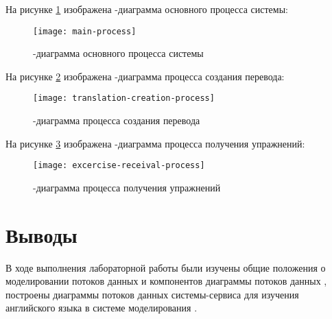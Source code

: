 \documentclass[a4paper,14pt]{extarticle}
\begin{document}
На рисунке \ref{fig:main-process} изображена -диаграмма основного
процесса системы:

\begin{figure}[H]
    \centering
    \texttt{[image: main-process]}
    \caption{-диаграмма основного процесса системы}
    \label{fig:main-process}
\end{figure}

На рисунке \ref{fig:translation-creation-process} изображена
-диаграмма процесса создания перевода:

\begin{figure}[H]
    \centering
    \texttt{[image: translation-creation-process]}
    \caption{-диаграмма процесса создания перевода}
    \label{fig:translation-creation-process}
\end{figure}

На рисунке \ref{fig:excercise-receival-process} изображена -диаграмма
процесса получения упражнений:

\begin{figure}[H]
    \centering
    \texttt{[image: excercise-receival-process]}
    \caption{-диаграмма процесса получения упражнений}
    \label{fig:excercise-receival-process}
\end{figure}

\section*{Выводы}
В ходе выполнения лабораторной работы были изучены общие положения о
моделировании потоков данных и компонентов диаграммы потоков данных ,
построены диаграммы потоков данных системы-сервиса для изучения английского
языка в системе моделирования .
\end{document}
